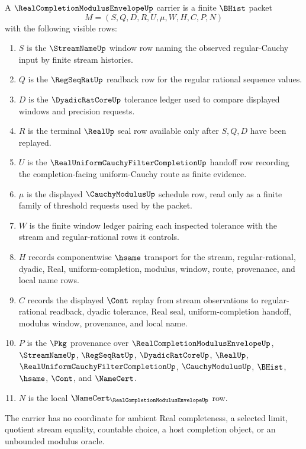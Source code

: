 \begin{definition}
\label{def:real-completion-modulus-envelope-carrier}
A $\RealCompletionModulusEnvelopeUp$ carrier is a finite $\BHist$ packet
$$
M=(S,Q,D,R,U,\mu,W,H,C,P,N)
$$
with the following visible rows:
\begin{enumerate}
\item $S$ is the $\StreamNameUp$ window row naming the observed regular-Cauchy input by finite stream histories.
\item $Q$ is the $\RegSeqRatUp$ readback row for the regular rational sequence values.
\item $D$ is the $\DyadicRatCoreUp$ tolerance ledger used to compare displayed windows and precision requests.
\item $R$ is the terminal $\RealUp$ seal row available only after $S,Q,D$ have been replayed.
\item $U$ is the $\RealUniformCauchyFilterCompletionUp$ handoff row recording the completion-facing uniform-Cauchy route as finite evidence.
\item $\mu$ is the displayed $\CauchyModulusUp$ schedule row, read only as a finite family of threshold requests used by the packet.
\item $W$ is the finite window ledger pairing each inspected tolerance with the stream and regular-rational rows it controls.
\item $H$ records componentwise $\hsame$ transport for the stream, regular-rational, dyadic, Real, uniform-completion, modulus, window, route, provenance, and local name rows.
\item $C$ records the displayed $\Cont$ replay from stream observations to regular-rational readback, dyadic tolerance, Real seal, uniform-completion handoff, modulus window, provenance, and local name.
\item $P$ is the $\Pkg$ provenance over $\RealCompletionModulusEnvelopeUp$, $\StreamNameUp$, $\RegSeqRatUp$, $\DyadicRatCoreUp$, $\RealUp$, $\RealUniformCauchyFilterCompletionUp$, $\CauchyModulusUp$, $\BHist$, $\hsame$, $\Cont$, and $\NameCert$.
\item $N$ is the local $\NameCert_{\RealCompletionModulusEnvelopeUp}$ row.
\end{enumerate}
The carrier has no coordinate for ambient Real completeness, a selected limit, quotient stream equality, countable choice, a host completion object, or an unbounded modulus oracle.
\end{definition}

